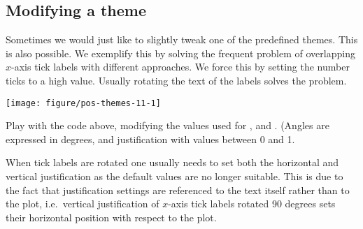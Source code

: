 \documentclass[krantz2]{krantz}\usepackage{knitr}%
\begin{document}
\subsection{Modifying a theme}
Sometimes we would just like to slightly tweak one of the predefined themes. This is also possible. We exemplify this by solving the frequent problem of overlapping $x$-axis tick labels with different approaches. We force this by setting the number ticks to a high value. Usually rotating the text of the labels solves the problem.

\begin{knitrout}\footnotesize
{}\color{fgcolor}\begin{kframe}
\begin{alltt}
  \hlopt{+}  \hlopt{+}
  \hlstd{()} \hlopt{+}
  \hlstd{(} \hlopt{::}\hlstd{(} \hlstd{=} \hlstd{))} \hlopt{+}
  \hlstd{(} \hlstd{=} \hlstd{(} \hlstd{=} \hlstd{,}  \hlstd{=} \hlstd{,}  \hlstd{=} \hlstd{))}
\end{alltt}
\end{kframe}

{\centering \texttt{[image: figure/pos-themes-11-1]} 

}



\end{knitrout}

\begin{playground}
Play with the code above, modifying the values used for ,  and . (Angles are expressed in degrees, and justification with values between 0 and 1.
\end{playground}

\begin{warningbox}
When tick labels are rotated one usually needs to set both the horizontal and vertical justification as the default values are no longer suitable. This is due to the fact that justification settings are referenced to the text itself rather than to the plot, i.e.\ vertical justification of $x$-axis tick labels rotated 90 degrees sets their horizontal position with respect to the plot.
\end{warningbox}
\end{document}
